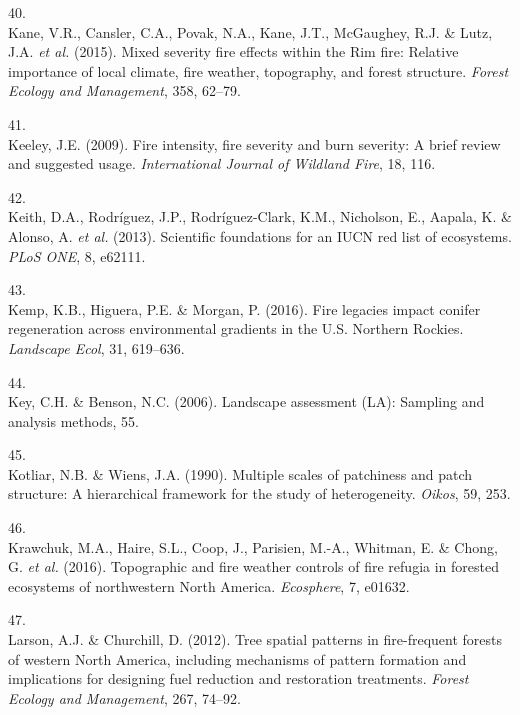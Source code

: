 \documentclass[]{article}
\begin{document}
\leavevmode\hypertarget{ref-kane2015}{}%
40.\\
Kane, V.R., Cansler, C.A., Povak, N.A., Kane, J.T., McGaughey, R.J. \&
Lutz, J.A. \emph{et al.} (2015). Mixed severity fire effects within the
Rim fire: Relative importance of local climate, fire weather,
topography, and forest structure. \emph{Forest Ecology and Management},
358, 62--79.

\leavevmode\hypertarget{ref-keeley2009}{}%
41.\\
Keeley, J.E. (2009). Fire intensity, fire severity and burn severity: A
brief review and suggested usage. \emph{International Journal of
Wildland Fire}, 18, 116.

\leavevmode\hypertarget{ref-keith2013}{}%
42.\\
Keith, D.A., Rodríguez, J.P., Rodríguez-Clark, K.M., Nicholson, E.,
Aapala, K. \& Alonso, A. \emph{et al.} (2013). Scientific foundations
for an IUCN red list of ecosystems. \emph{PLoS ONE}, 8, e62111.

\leavevmode\hypertarget{ref-kemp2016}{}%
43.\\
Kemp, K.B., Higuera, P.E. \& Morgan, P. (2016). Fire legacies impact
conifer regeneration across environmental gradients in the U.S. Northern
Rockies. \emph{Landscape Ecol}, 31, 619--636.

\leavevmode\hypertarget{ref-key2006}{}%
44.\\
Key, C.H. \& Benson, N.C. (2006). Landscape assessment (LA): Sampling
and analysis methods, 55.

\leavevmode\hypertarget{ref-kotliar1990}{}%
45.\\
Kotliar, N.B. \& Wiens, J.A. (1990). Multiple scales of patchiness and
patch structure: A hierarchical framework for the study of
heterogeneity. \emph{Oikos}, 59, 253.

\leavevmode\hypertarget{ref-krawchuk2016}{}%
46.\\
Krawchuk, M.A., Haire, S.L., Coop, J., Parisien, M.-A., Whitman, E. \&
Chong, G. \emph{et al.} (2016). Topographic and fire weather controls of
fire refugia in forested ecosystems of northwestern North America.
\emph{Ecosphere}, 7, e01632.

\leavevmode\hypertarget{ref-larson2012}{}%
47.\\
Larson, A.J. \& Churchill, D. (2012). Tree spatial patterns in
fire-frequent forests of western North America, including mechanisms of
pattern formation and implications for designing fuel reduction and
restoration treatments. \emph{Forest Ecology and Management}, 267,
74--92.
\end{document}
